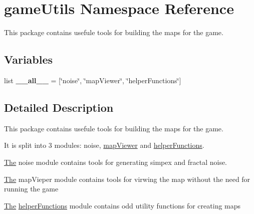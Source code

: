 \hypertarget{namespacegame_utils}{}\section{game\+Utils Namespace Reference}
\label{namespacegame_utils}


This package contains usefule tools for building the maps for the game.  


\subsection*{Variables}
\begin{DoxyCompactItemize}
\item 
\hypertarget{namespacegame_utils_a85b189d0d0877d831a5b3cbca19025fa}{}list {\bfseries \+\_\+\+\_\+all\+\_\+\+\_\+} = \mbox{[}\char`\"{}noise\char`\"{}, \char`\"{}map\+Viewer\char`\"{}, \char`\"{}helper\+Functions\char`\"{}\mbox{]}\label{namespacegame_utils_a85b189d0d0877d831a5b3cbca19025fa}

\end{DoxyCompactItemize}


\subsection{Detailed Description}
This package contains usefule tools for building the maps for the game. 

It is split into 3 modules\+: noise, \hyperlink{namespacemap_viewer}{map\+Viewer} and \hyperlink{namespacehelper_functions}{helper\+Functions}.

\hyperlink{namespace_the}{The} noise module contains tools for generating simpex and fractal noise.

\hyperlink{namespace_the}{The} map\+Vieper module contains tools for virwing the map without the need for running the game

\hyperlink{namespace_the}{The} \hyperlink{namespacehelper_functions}{helper\+Functions} module contains odd utility functions for creating maps 